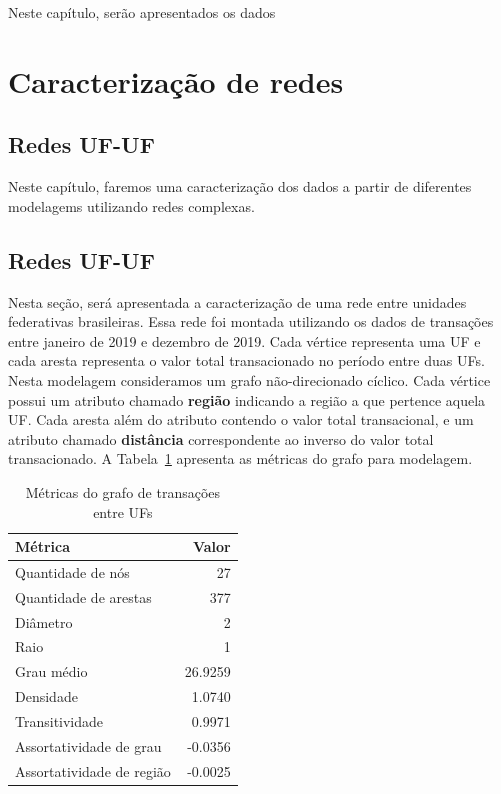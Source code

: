 
Neste capítulo, serão apresentados os dados 

\section{Caracterização de redes}
\label{section:metricas-redes}

\subsection{Redes UF-UF}

Neste capítulo, faremos uma caracterização dos dados a partir de diferentes modelagems utilizando redes complexas.

\subsection{Redes UF-UF}
\label{section:metricas-redes:uf}

Nesta seção, será apresentada a caracterização de uma rede entre unidades federativas brasileiras. Essa rede foi montada utilizando os dados de transações entre janeiro de 2019 e dezembro de 2019. Cada vértice representa uma UF e cada aresta representa o valor total transacionado no período entre duas UFs. Nesta modelagem consideramos um grafo não-direcionado cíclico. Cada vértice possui um atributo chamado \textbf{região} indicando a região a que pertence aquela UF. Cada aresta além do atributo contendo o valor total transacional, e um atributo chamado \textbf{distância} correspondente ao inverso do valor total transacionado. A Tabela~\ref{tab:metricas-redes:grafo-por-uf} apresenta as métricas do grafo para modelagem.

\begin{table}[htb]
\centering
\caption{Métricas do grafo de transações entre UFs}
\label{tab:metricas-redes:grafo-por-uf}
    \begin{tabular}{l|r}
    \toprule
    Métrica &  Valor \\
    \midrule
    Quantidade de nós         &  27      \\
    Quantidade de arestas     & 377      \\
    Diâmetro                  &   2      \\
    Raio                      &   1      \\
    Grau médio                &  26.9259 \\
    Densidade                 &   1.0740 \\
    Transitividade            &   0.9971 \\
    Assortatividade de grau   &  -0.0356 \\
    Assortatividade de região &  -0.0025 \\
    \bottomrule
    \end{tabular}
\fdadospesquisa
\end{table}

